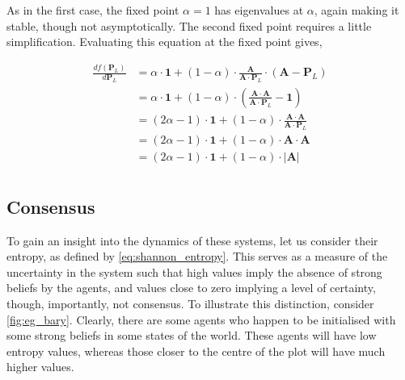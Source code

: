 As in the first case, the fixed point $\alpha = 1$ has eigenvalues at $\alpha$, again making it stable, though not asymptotically. The second fixed point requires a little simplification. Evaluating this equation at the fixed point gives,

\begin{align*}
    \frac{d f(\mathbf{P}_L)}{d \mathbf{P}_L} &= \alpha \cdot \mathbf{1} + (1 - \alpha) \cdot \frac{\mathbf{A}}{\mathbf{A} \cdot \mathbf{P}_L} \cdot \left(  \mathbf{A} - \mathbf{P}_L  \right)\\
    &= \alpha \cdot \mathbf{1} + (1 - \alpha) \cdot \left( \frac{\mathbf{A} \cdot \mathbf{A}}{\mathbf{A} \cdot \mathbf{P}_L} - \mathbf{1} \right) \\
    &= (2\alpha -1) \cdot \mathbf{1}  + (1 - \alpha) \cdot \frac{\mathbf{A} \cdot \mathbf{A}}{\mathbf{A} \cdot \mathbf{P}_L} \\
    &= (2\alpha -1) \cdot \mathbf{1}  + (1 - \alpha) \cdot \mathbf{A} \cdot \mathbf{A} \\
    &= (2\alpha -1) \cdot \mathbf{1}  + (1 - \alpha) \cdot |\mathbf{A}| \\
\end{align*}



\subsection{Consensus}

To gain an insight into the dynamics of these systems, let us consider their entropy, as defined by \cref{eq:shannon_entropy}. This serves as a measure of the uncertainty in the system such that high values imply the absence of strong beliefs by the agents, and values close to zero implying a level of certainty, though, importantly, not consensus. To illustrate this distinction, consider \cref{fig:eg_bary}. Clearly, there are some agents who happen to be initialised with some strong beliefs in some states of the world. These agents will have low entropy values, whereas those closer to the centre of the plot will have much higher values. 

